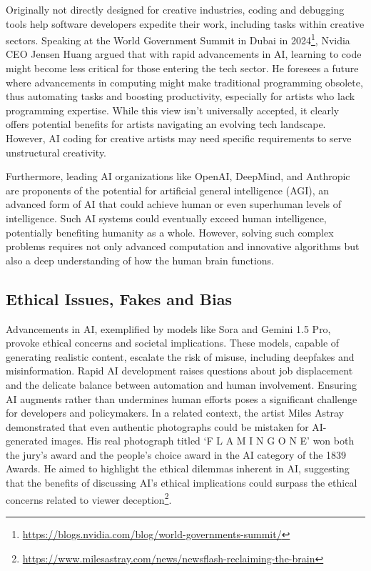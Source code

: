 \documentclass[11pt,a4paper]{article}
\begin{document}
Originally not directly designed for creative industries, coding and debugging tools \cite{zhong:LDB:2024} help software developers expedite their work, including tasks within creative sectors. Speaking at the World Government Summit in Dubai in 2024\footnote{\url{https://blogs.nvidia.com/blog/world-governments-summit/}}, Nvidia CEO Jensen Huang argued that with rapid advancements in AI, learning to code might become less critical for those entering the tech sector. He foresees a future where advancements in computing might make traditional programming obsolete, thus automating tasks and boosting productivity, especially for artists who lack programming expertise. While this view isn't universally accepted, it clearly offers potential benefits for artists navigating an evolving tech landscape. However, AI coding for creative artists may need specific requirements to serve unstructural creativity.

Furthermore, leading AI organizations like OpenAI, DeepMind, and Anthropic are proponents of the potential for artificial general intelligence (AGI), an advanced form of AI that could achieve human or even superhuman levels of intelligence. Such AI systems could eventually exceed human intelligence, potentially benefiting humanity as a whole. However, solving such complex problems requires not only advanced computation and innovative algorithms but also a deep understanding of how the human brain functions.

\subsection{Ethical Issues, Fakes and Bias}


Advancements in AI, exemplified by models like Sora and Gemini 1.5 Pro, provoke ethical concerns and societal implications. These models, capable of generating realistic content, escalate the risk of misuse, including deepfakes and misinformation. Rapid AI development raises questions about job displacement and the delicate balance between automation and human involvement. Ensuring AI augments rather than undermines human efforts poses a significant challenge for developers and policymakers. In a related context, the artist Miles Astray demonstrated that even authentic photographs could be mistaken for AI-generated images. His real photograph titled `F L A M I N G O N E' won both the jury’s award and the people’s choice award in the AI category of the 1839 Awards. He aimed to highlight the ethical dilemmas inherent in AI, suggesting that the benefits of discussing AI's ethical implications could surpass the ethical concerns related to viewer deception\footnote{\url{https://www.milesastray.com/news/newsflash-reclaiming-the-brain}}.
\end{document}
